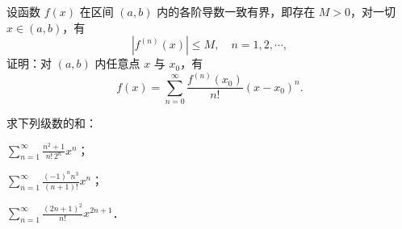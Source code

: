 \begin{xiti}
\item 设函数 $f(x)$ 在区间 $(a,b)$ 内的各阶导数一致有界，即存在 $M>0$，对一切 $x\in(a,b)$，有
\[
\left|f^{(n)}(x)\right|\leqslant M,\quad n=1,2,\cdots,
\]
证明：对 $(a,b)$ 内任意点 $x$ 与 $x_{0}$，有
\[
f(x)=\sum_{n=0}^{\infty}\frac{f^{(n)}(x_{0})}{n!}(x-x_{0})^{n}.
\]
\item 求下列级数的和：
\begin{ziti}
\item $\displaystyle\sum_{n=1}^{\infty}\frac{n^{2}+1}{n!\,2^{n}}x^{n}$；
\item $\displaystyle\sum_{n=1}^{\infty}\frac{(-1)^{n}n^{3}}{(n+1)!}x^{n}$；
\item $\displaystyle\sum_{n=1}^{\infty}\frac{(2n+1)^{2}}{n!}x^{2n+1}$．
\end{ziti}
\end{xiti}
